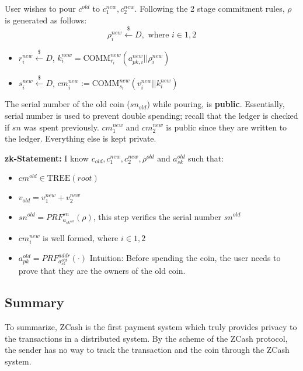 \documentclass[twoside]{article}
\begin{document}
User wishes to pour $c^{old}$ to $c_1^{new}, c_2^{new}$. Following the 2 stage commitment rules, 
$\rho$ is generated as follows:
$$\rho_i^{new} \xleftarrow{\$}D, \text{ where } i \in {1, 2}$$
\begin{itemize}
    \item $r_i^{new} \xleftarrow{\$}D$, $k_i^{new}=\text{COMM}_{r_{i}}^{new}(a_{pk, i}^{new} || \rho_i^{new})$
    \item $s_i^{new} \xleftarrow{\$} D$, $cm_i^{new} := \text{COMM}_{s_{i}}^{new}(v_i^{new} || k_i^{new})$
\end{itemize}
The serial number of the old coin ($sn_{old}$) while pouring, is \textbf{public}. 
Essentially, serial number is used to prevent double spending; recall that the ledger is checked if $sn$ was spent previously. $cm_1^{new}$ and $cm_2^{new}$ is public since they are written to the ledger. Everything else is kept private. 

\textbf{zk-Statement:} I know $c_{old}, c_1^{new}, c_2^{new}, \rho^{old} \text{ and } a_{sk}^{old}$ such that: 
\begin{itemize}
    \item  $cm^{old} \in \text{TREE}(root)$
    \item  $v_{old} = v_1^{new} + v_2^{new}$
    \item  $sn^{old} = PRF_{a_{sk^{old}}}^{sn}(\rho)$, this step verifies the serial number $sn^{old}$
    \item $cm_i^{new}$ is well formed, where $i \in {1, 2}$
    \item $a_{pk}^{old} = PRF_{a_{sk}^{old}}^{addr}(\cdot)$  Intuition: Before spending the coin, the user needs to prove that they are the owners of the old coin. 
\end{itemize}

\subsection{Summary}
To summarize, ZCash is the first payment system which truly provides privacy to the transactions in a distributed system. By the scheme of the ZCash protocol, the sender has no way to track the transaction and the coin through the ZCash system. 
\end{document}
